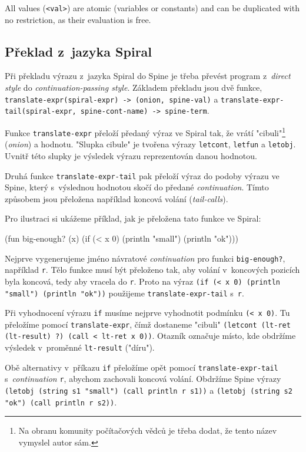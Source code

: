 All values (\texttt{<val>}) are atomic (variables or constants) and can be
duplicated with no restriction, as their evaluation is free.

\subsection{Překlad z~jazyka Spiral}

Při překladu výrazu z~jazyka Spiral do Spine je třeba převést program
z~\emph{direct style} do \emph{continuation-passing style}. Základem překladu
jsou dvě funkce, \texttt{translate-expr(spiral-expr) -> (onion, spine-val)} a
\texttt{translate-expr-tail(spiral-expr, spine-cont-name) -> spine-term}.

Funkce \texttt{translate-expr} přeloží předaný výraz ve Spiral tak, že vrátí
"cibuli"\footnote{Na obranu komunity počítačových vědců je třeba dodat, že
tento název vymyslel autor sám.} (\emph{onion}) a hodnotu. "Slupka cibule" je
tvořena výrazy \texttt{letcont}, \texttt{letfun} a \texttt{letobj}. Uvnitř této
slupky je výsledek výrazu reprezentován danou hodnotou.

Druhá funkce \texttt{translate-expr-tail} pak přeloží výraz do podoby výrazu ve
Spine, který s~výslednou hodnotou skočí do předané \emph{continuation}. Tímto
způsobem jsou přeložena například koncová volání (\emph{tail-calls}).

Pro ilustraci si ukážeme příklad, jak je přeložena tato funkce ve Spiral:

\begin{spiral}
(fun big-enough? (x)
  (if (< x 0)
    (println "small")
    (println "ok")))
\end{spiral}

Nejprve vygenerujeme jméno návratové \emph{continuation} pro funkci
\texttt{big-enough?}, například \texttt{r}. Tělo funkce musí být přeloženo tak,
aby volání v~koncových pozicích byla koncová, tedy aby vracela do \texttt{r}.
Proto na výraz \texttt{(if (< x 0) (println "small") (println "ok"))} použijeme
\texttt{translate-expr-tail} s~\texttt{r}.

Při vyhodnocení výrazu \texttt{if} musíme nejprve vyhodnotit podmínku \texttt{(<
x 0)}. Tu přeložíme pomocí \texttt{translate-expr}, čímž dostaneme "cibuli"
\texttt{(letcont (lt-ret (lt-result) ?) (call < lt-ret x 0))}. Otazník označuje
místo, kde obdržíme výsledek v~proměnné \texttt{lt-result} ("díru").

Obě alternativy v~příkazu \texttt{if} přeložíme opět pomocí
\texttt{translate-expr-tail} s~\emph{continuation} \texttt{r}, abychom zachovali
koncová volání. Obdržíme Spine výrazy \texttt{(letobj (string s1 "small") (call
println r s1))} a \texttt{(letobj (string s2 "ok") (call println r s2))}.

